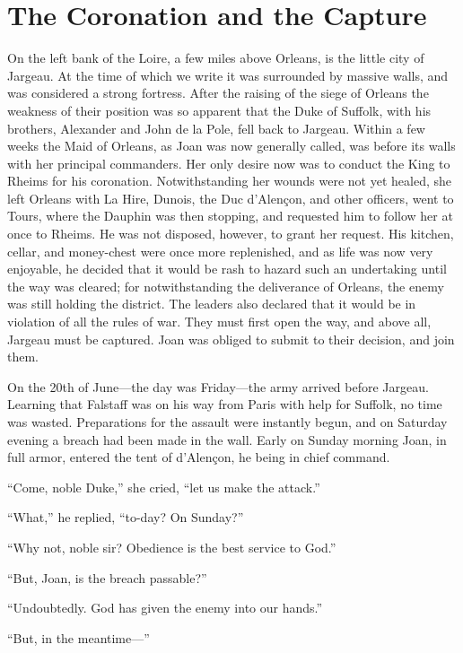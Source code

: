\chapter{The Coronation and the Capture}

\drop On the left bank of the Loire, a few miles above Orleans, is the
little city of Jargeau. At the time of which we write it was surrounded
by massive walls, and was considered a strong fortress. After the
raising of the siege of Orleans the weakness of their position was so
apparent that the Duke of Suffolk, with his brothers, Alexander and John
de la Pole, fell back to Jargeau. Within a few weeks the Maid of
Orleans, as Joan was now generally called, was before its walls with her
principal commanders. Her only desire now was to conduct the King to
Rheims for his coronation. Notwithstanding her wounds were not yet
healed, she left Orleans with La Hire, Dunois, the Duc d'Alençon, and
other officers, went to Tours, where the Dauphin was then stopping, and
requested him to follow her at once to Rheims. He was not disposed,
however, to grant her request. His kitchen, cellar, and money-chest were
once more replenished, and as life was now very enjoyable, he decided
that it would be rash to hazard such an undertaking until the way was
cleared; for notwithstanding the deliverance of Orleans, the enemy was
still holding the district. The leaders also declared that it would be
in violation of all the rules of war. They must first open the way, and
above all, Jargeau must be captured. Joan was obliged to submit to their
decision, and join them.

On the 20th of June---the day was Friday---the army arrived before
Jargeau. Learning that Falstaff was on his way from Paris with help for
Suffolk, no time was wasted. Preparations for the assault were instantly
begun, and on Saturday evening a breach had been made in the wall. Early
on Sunday morning Joan, in full armor, entered the tent of d'Alençon, he
being in chief command.

``Come, noble Duke,'' she cried, ``let us make the attack.''

``What,'' he replied, ``to-day? On Sunday?''

``Why not, noble sir? Obedience is the best service to God.''

``But, Joan, is the breach passable?''

``Undoubtedly. God has given the enemy into our hands.''

``But, in the meantime---''

